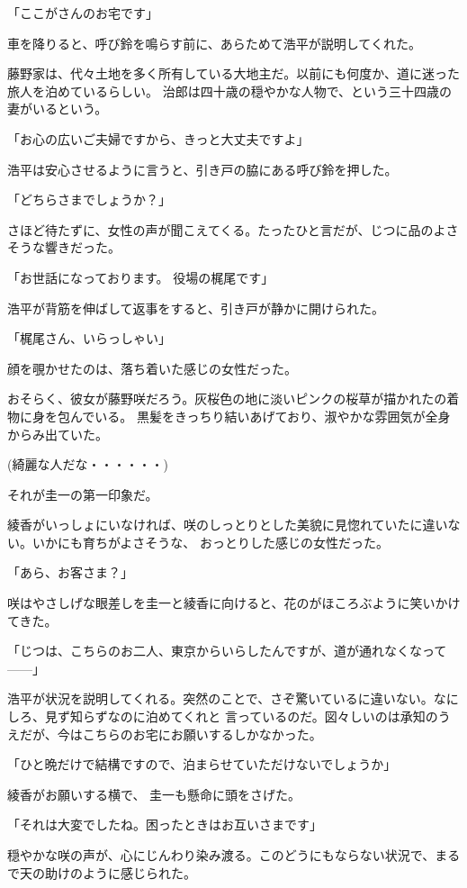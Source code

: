 ﻿\documentclass[book,tate]{jlreq}
\begin{document}
「ここがさんのお宅です」

車を降りると、呼び鈴を鳴らす前に、あらためて浩平が説明してくれた。

藤野家は、代々土地を多く所有している大地主だ。以前にも何度か、道に迷った旅人を泊めているらしい。
治郎は四十歳の穏やかな人物で、という三十四歳の妻がいるという。

「お心の広いご夫婦ですから、きっと大丈夫ですよ」

浩平は安心させるように言うと、引き戸の脇にある呼び鈴を押した。

「どちらさまでしょうか？」

さほど待たずに、女性の声が聞こえてくる。たったひと言だが、じつに品のよさそうな響きだった。

「お世話になっております。 役場の梶尾です」

浩平が背筋を伸ばして返事をすると、引き戸が静かに開けられた。

「梶尾さん、いらっしゃい」

顔を覗かせたのは、落ち着いた感じの女性だった。

おそらく、彼女が藤野咲だろう。灰桜色の地に淡いピンクの桜草が描かれたの着物に身を包んでいる。
黒髪をきっちり結いあげており、淑やかな雰囲気が全身からみ出ていた。

(綺麗な人だな・・・・・・)

それが圭一の第一印象だ。

綾香がいっしょにいなければ、咲のしっとりとした美貌に見惚れていたに違いない。いかにも育ちがよさそうな、
おっとりした感じの女性だった。

「あら、お客さま？」

咲はやさしげな眼差しを圭一と綾香に向けると、花のがほころぶように笑いかけてきた。

「じつは、こちらのお二人、東京からいらしたんですが、道が通れなくなって------」

浩平が状況を説明してくれる。突然のことで、さぞ驚いているに違いない。なにしろ、見ず知らずなのに泊めてくれと
言っているのだ。図々しいのは承知のうえだが、今はこちらのお宅にお願いするしかなかった。

「ひと晩だけで結構ですので、泊まらせていただけないでしょうか」

綾香がお願いする横で、 圭一も懸命に頭をさげた。

「それは大変でしたね。困ったときはお互いさまです」

穏やかな咲の声が、心にじんわり染み渡る。このどうにもならない状況で、まるで天の助けのように感じられた。
\end{document}
